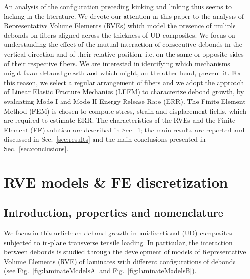 \documentclass[smallextended]{svjour3}       %
\begin{document}
An analysis of the configuration preceding kinking and linking thus seems to lacking in the literature. We devote our attention in this paper to the analysis of Representative Volume Elements (RVEs) which model the presence of muliple debonds on fibers aligned across the thickness of UD composites. We focus on understanding the effect of the mutual interaction of consecutive debonds in the vertical direction and of their relative position, i.e. on the same or opposite sides of their respective fibers. We are interested in identifying which mechanisms might favor debond growth and which might, on the other hand, prevent it. For this reason, we select a regular arrangement of fibers and we adopt the approach of Linear Elastic Fracture Mechanics (LEFM) to characterize debond growth, by evaluating Mode I and Mode II Energy Release Rate (ERR). The Finite Element Method (FEM) is chosen to compute stress, strain and displacement fields, which are required to estimate ERR. The characteristics of the RVEs and the Finite Element (FE) solution are described in Sec.~\ref{sec:rveFem}; the main results are reported and discussed in Sec.~\ref{sec:results} and the main conclusions presented in Sec.~\ref{sec:conclusions}.


\section{RVE models \& FE discretization}\label{sec:rveFem}

\subsection{Introduction, properties and nomenclature}\label{subsec:names}

We focus in this article on debond growth in unidirectional (UD) composites subjected to in-plane transverse tensile loading. In particular, the interaction between debonds is studied through the development of models of Representative Volume Elements (RVE) of laminates with different configurations of debonds (see Fig.~\ref{fig:laminateModelsA} and Fig.~\ref{fig:laminateModelsB}).
\end{document}
